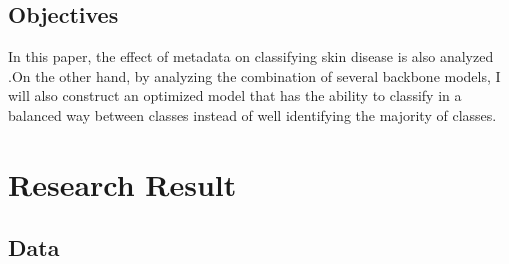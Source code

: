 \subsection{Objectives}
In this paper, the effect of metadata on classifying skin disease is also analyzed .On the other hand, by analyzing the combination of several backbone models, I will also construct an optimized model that has the ability to classify in a balanced way between classes instead of well identifying the majority of classes. 

\section{Research Result}
\subsection{Data}
